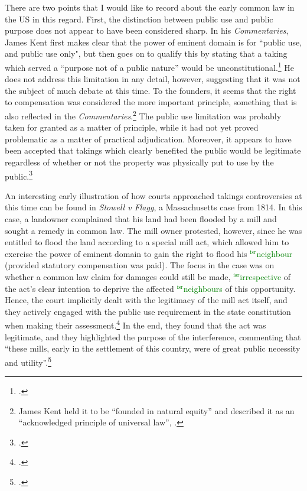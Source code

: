 \documentclass[12pt,a4paper]{book} %
\newcommand{\isr}[1]{\textcolor{green}{$^{\textrm{isr}}${#1}}}
\begin{document}
There are two points that I would like to record about the early common law in the US  in this regard. First, the distinction between public use and public purpose does not appear to have been considered sharp. In his {\it Commentaries}, James Kent first makes clear that the power of eminent domain is for ``public use, and public use only", but then goes on to qualify this by stating that a taking which served a ``purpose not of a public nature'' would be unconstitutional.\footcite[See][275-276]{kent27}  He does not address this limitation in any detail, however, suggesting that it was not the subject of much debate at this time. To the founders, it seems that the right to compensation was considered the more important principle, something that is also reflected in the {\it Commentaries}.\footnote{James Kent held it to be  ``founded in natural equity'' and described it as an ``acknowledged principle of universal law'', \cite[see][276]{kent27}.} The public use limitation was probably taken for granted as a matter of principle, while it had not yet proved problematic as a matter of practical adjudication. Moreover, it appears to have been accepted that takings which clearly benefited the public would be legitimate regardless of whether or not the property was physically put to use by the public.\footcite{johnson11}

An interesting early illustration of how courts approached takings controversies at this time can be found in {\it Stowell v Flagg}, a Massachusetts case from 1814. In this case, a landowner complained that his land had been flooded by a mill and sought a remedy in common law. The mill owner protested, however, since he was entitled to flood the land according to a special mill act, which allowed him to exercise the power of eminent domain to gain the right to flood his \isr{neighbour} (provided statutory compensation was paid). The focus in the case was on whether a common law claim for damages could still be made, \isr{irrespective} of the act's clear intention to deprive the affected \isr{neighbours} of this opportunity. Hence, the court implicitly dealt with the legitimacy of the mill act itself, and they actively engaged with the public use requirement in the state constitution when making their assessment.\footcite{stowell14} In the end, they found that the act was legitimate, and they highlighted the purpose of the interference, commenting that ``these mills, early in the settlement of this country, were of great public necessity and utility''.\footcite[366]{stowell14} 
\end{document}
